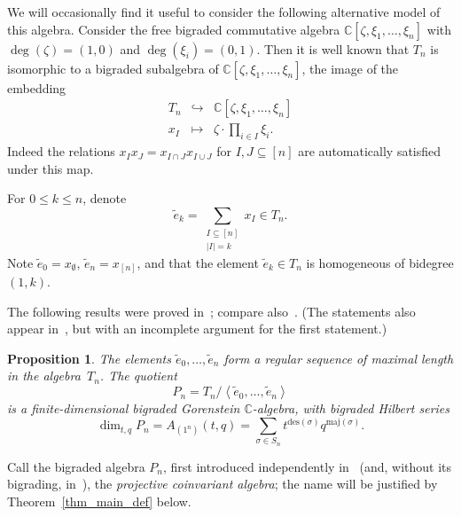 \documentclass[a4paper,11pt]{amsart}
\theoremstyle{plain}
\newtheorem{proposition}[theorem]{Proposition}
\theoremstyle{definition}
\newtheorem{remark}[theorem]{Remark}
\newcommand{\C}{\mathbb{C}}
\newcommand{\pa}{T} %
\newcommand{\te}{\widetilde{e}}
\begin{document}
We will occasionally find it useful to consider the following alternative model of this algebra. Consider the free bigraded commutative algebra
$\C[\zeta,\xi_1, \ldots, \xi_n]$ with $\deg(\zeta) =(1,0)$ and $\deg(\xi_i)=(0,1)$. Then it is well known that $T_n$ is isomorphic to a bigraded subalgebra of 
$\C[\zeta,\xi_1, \ldots, \xi_n]$, the image of the embedding
\begin{equation} \begin{array}{rcl} T_n & \hookrightarrow & \C[\zeta,\xi_1, \ldots, \xi_n]\\
x_I&\mapsto& \zeta\cdot \prod_{i\in I} \xi_i.
\end{array}\label{explicitembedding}
\end{equation}
Indeed the relations $x_{\scriptscriptstyle I}x_{\scriptscriptstyle J}=x_{\scriptscriptstyle I\cap J}x_{\scriptscriptstyle I\cup J}$ for $I,J\subseteq[n]$ are automatically satisfied under this map. 

For $0\leq k\leq n$, denote
\[\te_k= \sum_{\substack{I\subseteq[n]\\|I|=k}} x_{\scriptscriptstyle I}\in \pa_n. 
\]
Note $\te_0=x_{\scriptscriptstyle\emptyset}$, $\te_n = x_{\scriptscriptstyle [n]}$, and that the element $\te_k\in\pa_n$ is homogeneous of bidegree $(1,k)$.

The following results were proved in~\cite[Prop.2.7]{AS}; compare also~\cite[Section 4]{ORS}. (The statements also appear in~\cite{BO}, but with an incomplete argument for the first statement.)
\begin{proposition} \label{prop_reg}
The elements $\te_0, \ldots, \te_n$ form a regular sequence of maximal length in the algebra~$\pa_n$. The quotient
\[P_n = \pa_n / \left\langle \te_0, \ldots, \te_n\right\rangle\]
is a finite-dimensional bigraded Gorenstein $\C$-algebra, with bigraded Hilbert series
\[
\dim_{t,q} P_n = A_{(1^n)}(t,q)=\sum_{\sigma\in S_n} t^{\mathrm{des}(\sigma)}q^{\mathrm{maj}(\sigma)}.
\]
\end{proposition}

Call the bigraded algebra $P_n$, first introduced independently in~\cite{BO, AS} (and, without its bigrading, in~\cite{ORS}), the {\em projective coinvariant algebra}; the name will be justified by Theorem~\ref{thm_main_def} below. 

\end{document}

